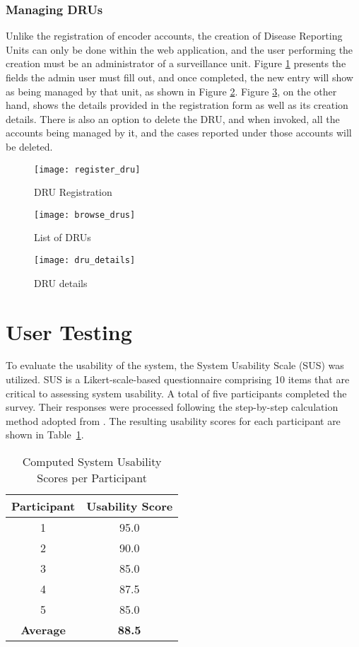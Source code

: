 \subsubsection{Managing DRUs}

Unlike the registration of encoder accounts, the creation of Disease Reporting Units can only be done within the web application, and the user performing the creation must be an administrator of a surveillance unit. Figure \ref{fig:register_dru} presents the fields the admin user must fill out, and once completed, the new entry will show as being managed by that unit, as shown in Figure \ref{fig:browse_drus}. Figure \ref{fig:dru_details}, on the other hand, shows the details provided in the registration form as well as its creation details. There is also an option to delete the DRU, and when invoked, all the accounts being managed by it, and the cases reported under those accounts will be deleted.

\begin{figure}[H]
	\centering
	\texttt{[image: register\_dru]}
	\caption{DRU Registration}
	\label{fig:register_dru}
\end{figure}
\begin{figure}[H]
	\centering
	\texttt{[image: browse\_drus]}
	\caption{List of DRUs}
	\label{fig:browse_drus}
\end{figure}
\begin{figure}[H]
	\centering
	\texttt{[image: dru\_details]}
	\caption{DRU details}
	\label{fig:dru_details}
\end{figure}


\section{User Testing}
To evaluate the usability of the system, the System Usability Scale (SUS) was utilized. SUS is a Likert-scale-based questionnaire comprising 10 items that are critical to assessing system usability. A total of five participants completed the survey. Their responses were processed following the step-by-step calculation method adopted from \cite{babich_sus_usability_website}. The resulting usability scores for each participant are shown in Table~\ref{tab:sus_scores}.

\begin{table}[h!]
	\centering
	\begin{tabular}{|c|c|}
		\hline
		\textbf{Participant} & \textbf{Usability Score} \\
		\hline
		1 & 95.0 \\
		2 & 90.0 \\
		3 & 85.0 \\
		4 & 87.5 \\
		5 & 85.0 \\
		\hline
		\textbf{Average} & \textbf{88.5} \\
		\hline
	\end{tabular}
	\caption{Computed System Usability Scores per Participant}
	\label{tab:sus_scores}
\end{table}

